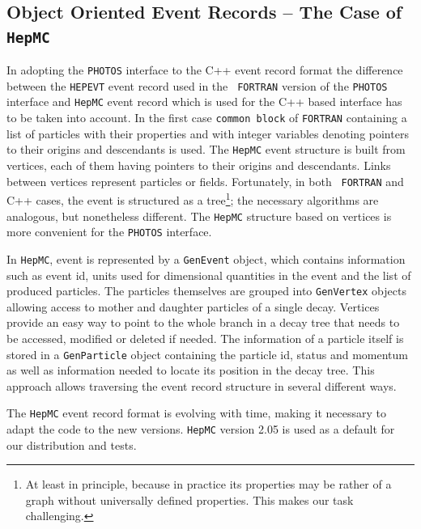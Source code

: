 \documentclass[]{Photos_interface_design}
\begin{document}
\subsection{Object Oriented Event Records  -- The Case of {\tt HepMC}}
 In adopting the {\tt PHOTOS} interface to the C++ event record format
the difference between the {\tt HEPEVT} event record used in the {\tt
  FORTRAN} version of the {\tt PHOTOS} interface and {\tt HepMC} event
record which is used for the C++ based interface has to be taken into
account.  In the first case 
{\tt common block} of {\tt FORTRAN} containing a list of particles with their properties and
with integer variables denoting pointers to their origins and
descendants is used.  The {\tt HepMC} event structure is built from vertices,
each of them having pointers to their origins and descendants. Links
between vertices represent particles or fields.  Fortunately, in both {\tt
  FORTRAN} and C++ cases, the event is structured as a
tree\footnote{At least in principle, because in practice its
properties may be rather of a graph without universally defined
properties.  This makes our task challenging.}; the necessary
algorithms are analogous, but nonetheless different. The {\tt HepMC}
structure based on vertices is more convenient for the {\tt PHOTOS}
interface. 

In {\tt HepMC}, event is represented by a {\tt GenEvent} object,
which contains information such as event id,
units used for dimensional quantities in the event and the list of produced particles. The particles
themselves are grouped into {\tt GenVertex} objects allowing access to mother
and daughter particles of a single decay. Vertices provide an easy way
to point to the whole branch in a decay tree that needs to be accessed,
modified or deleted if needed. The information of a particle  itself is stored
in a {\tt GenParticle} object containing the particle id, status and momentum
as well as information needed to locate its position in the decay tree.
This approach allows traversing the event record structure in several different
ways.

The {\tt HepMC} event record format is  evolving with time, making it necessary
 to adapt
the code to the new versions.
{\tt HepMC} version 2.05 is used as a default for our distribution and tests. 
\end{document}
